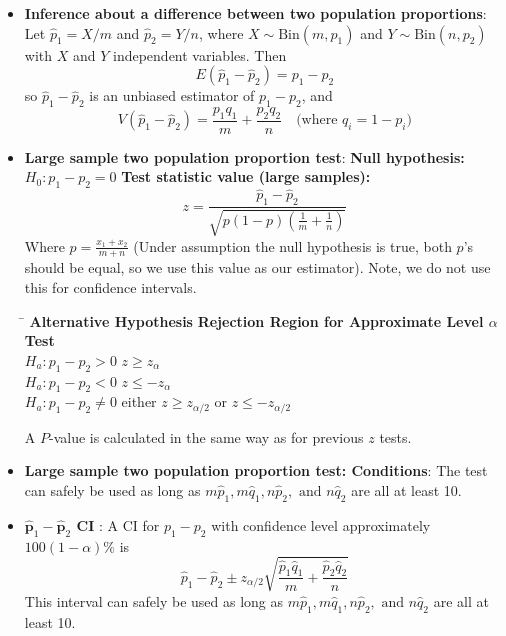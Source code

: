 \documentclass{report}
\begin{document}
\begin{itemize}
    \item \textbf{Inference about a difference between two population proportions}:
        Let $\hat{p}_1 = X/m$ and $\hat{p}_2 = Y/n$, where $X \sim \text{Bin}(m, p_1)$ and $Y \sim \text{Bin}(n, p_2)$ with $X$ and $Y$ independent variables. Then
        \[
            E(\hat{p}_1 - \hat{p}_2) = p_1 - p_2
        \]
        so $\hat{p}_1 - \hat{p}_2$ is an unbiased estimator of $p_1 - p_2$, and
        \[
            V(\hat{p}_1 - \hat{p}_2) = \frac{p_1 q_1}{m} + \frac{p_2 q_2}{n} \quad \text{(where } q_i = 1 - p_i\text{)}
        \]
    \item \textbf{Large sample two population proportion test}:
        \bigbreak \noindent 
        \textbf{Null hypothesis:} $H_0: p_1 - p_2 = 0$
        \bigbreak \noindent 
        \textbf{Test statistic value (large samples):}
        \[
            z = \frac{\hat{p}_1 - \hat{p}_2}{\sqrt{p(1-p) \left( \frac{1}{m} + \frac{1}{n} \right)}}
        \]
        \bigbreak \noindent 
        Where $p=\frac{x_1 + x_2}{m + n}$ (Under assumption the null hypothesis is true, both $p$'s should be equal, so we use this value as our estimator). Note, we do not use this for confidence intervals.
        \bigbreak \noindent 
        \begin{tabbing}
            \hspace{3cm} \= \kill
            \textbf{Alternative Hypothesis} \hspace{1.5cm} \textbf{Rejection Region for Approximate Level $\alpha$ Test} \\
            $H_a: p_1 - p_2 > 0$ \hspace{3.7cm} $z \ge z_{\alpha}$ \\
            $H_a: p_1 - p_2 < 0$ \hspace{3.7cm} $z \le -z_{\alpha}$ \\
            $H_a: p_1 - p_2 \neq 0$ \hspace{3.7cm} either $z \ge z_{\alpha/2}$ or $z \le -z_{\alpha/2}$ \\
        \end{tabbing}
        \bigbreak \noindent 
        A $P$-value is calculated in the same way as for previous $z$ tests. 
        \item \textbf{Large sample two population proportion test: Conditions}:
        The test can safely be used as long as $m\hat{p}_1, m\hat{q}_1, n\hat{p}_2, \text{ and } n\hat{q}_2$ are all at least 10.
    \item \textbf{ $\hat{\mathbf{p}}_{1} -  \hat{\mathbf{p}}_{2}$ CI }:
        A CI for $p_1 - p_2$ with confidence level approximately $100(1 - \alpha)\%$ is
        \[
            \hat{p}_1 - \hat{p}_2 \pm z_{\alpha/2} \sqrt{\frac{\hat{p}_1 \hat{q}_1}{m} + \frac{\hat{p}_2 \hat{q}_2}{n}}
        \]
        This interval can safely be used as long as $m\hat{p}_1, m\hat{q}_1, n\hat{p}_2, \text{ and } n\hat{q}_2$ are all at least 10.
    \end{itemize}
\end{document}
